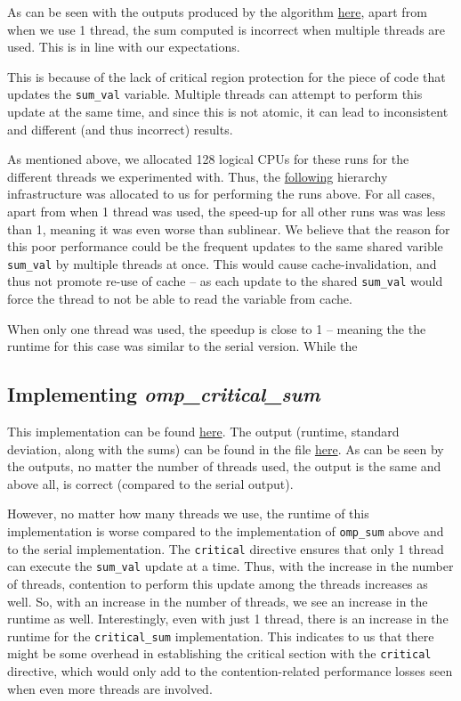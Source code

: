 \documentclass[a4paper,10pt]{article}
\begin{document}
As can be seen with the outputs produced by the algorithm \href{https://github.com/paulmyr/DD2356-MethodsHPC/blob/master/3_open_mp/exercise3/outputs/omp_output.txt}{here}, apart from when we use 1 thread, the sum computed is incorrect when multiple threads are used. This is in line with our expectations. 

This is because of the lack of critical region protection for the piece of code that updates the \verb|sum_val| variable. Multiple threads can attempt to perform this update at the same time, and since this is not atomic, it can lead to inconsistent and different (and thus incorrect) results.  

As mentioned above, we allocated 128 logical CPUs for these runs for the different threads we experimented with. Thus, the \href{https://github.com/paulmyr/DD2356-MethodsHPC/blob/master/3_open_mp/img/ex3/ex3_topology_omp_sum.svg}{following} hierarchy infrastructure was allocated to us for performing the runs above. For all cases, apart from when 1 thread was used, the speed-up for all other runs was was less than 1, meaning it was even worse than sublinear. We believe that the reason for this poor performance could be the frequent updates to the same shared varible \verb|sum_val| by multiple threads at once. This would cause cache-invalidation, and thus not promote re-use of cache -- as each update to the shared \verb|sum_val| would force the thread to not be able to read the variable from cache. 

When only one thread was used, the speedup is close to 1 -- meaning the the runtime for this case was similar to the serial version. While the 

\subsection{Implementing \textit{omp\_critical\_sum}}
This implementation can be found \href{https://github.com/paulmyr/DD2356-MethodsHPC/blob/master/3_open_mp/exercise3/omp_critical_sum.c}{here}. The output (runtime, standard deviation, along with the sums) can be found in the file \href{https://github.com/paulmyr/DD2356-MethodsHPC/blob/master/3_open_mp/exercise3/outputs/omp_critical_output.txt}{here}. As can be seen by the outputs, no matter the number of threads used, the output is the same and above all, is correct (compared to the serial output). 

However, no matter how many threads we use, the runtime of this implementation is worse compared to the implementation of \verb|omp_sum| above and to the serial implementation. The \verb|critical| directive ensures that only 1 thread can execute the \verb|sum_val| update at a time. Thus, with the increase in the number of threads, contention to perform this update among the threads increases as well. So, with an increase in the number of threads, we see an increase in the runtime as well. Interestingly, even with just 1 thread, there is an increase in the runtime for the \verb|critical_sum| implementation. This indicates to us that there might be some overhead in establishing the critical section with the \verb|critical| directive, which would only add to the contention-related performance losses seen when even more threads are involved.
\end{document}
